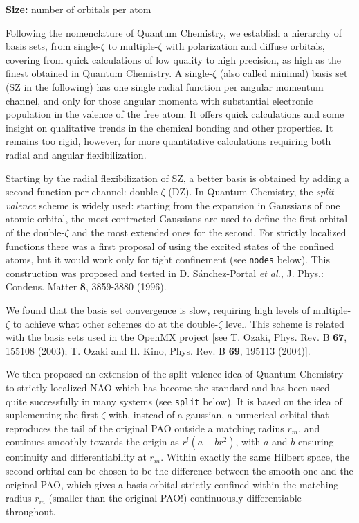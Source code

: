 \textbf{Size:} number of orbitals per atom

  Following the nomenclature of Quantum Chemistry, we establish
a hierarchy of basis sets, from single-$\zeta$ to multiple-$\zeta$
with polarization and diffuse orbitals, covering from quick calculations
of low quality to high precision, as high as the finest obtained in
Quantum Chemistry.
  A single-$\zeta$ (also called minimal) basis set (SZ in the following)
has one single radial function per angular momentum channel, and only for
those angular momenta with substantial electronic population in the valence of
the free atom.
  It offers quick calculations and some insight on qualitative trends
in the chemical bonding and other properties.
  It remains too rigid, however, for more quantitative calculations
requiring both radial and angular flexibilization.

  Starting by the radial flexibilization of SZ, a better basis is obtained
by adding a second function per channel: double-$\zeta$ (DZ).
  In Quantum Chemistry, the \textit{split valence} scheme
is widely used: starting from the expansion in Gaussians of one atomic
orbital, the most contracted Gaussians are used to define the first
orbital of the double-$\zeta$ and the most extended ones for the second.
  For strictly localized functions there was a first proposal
of using the excited states of the confined atoms, but it would work only
for tight confinement (see  \texttt{nodes} below).
  This construction was proposed and tested in D. S\'anchez-Portal
\textit{et al.}, J. Phys.: Condens. Matter \textbf{8}, 3859-3880 (1996).

  We found that the basis set convergence is slow, requiring high levels
of multiple-$\zeta$ to achieve what other schemes do at the double-$\zeta$
level.
  This scheme is related with the basis sets used in the OpenMX project
[see T. Ozaki, Phys. Rev. B \textbf{67}, 155108 (2003); T. Ozaki and H. Kino,
Phys. Rev. B \textbf{69}, 195113 (2004)].

  We then proposed an extension of the split valence idea of Quantum Chemistry
to strictly localized NAO which has become the standard and has been used
quite successfully in many systems (see  \texttt{split} below).
  It is based on the idea of suplementing the first $\zeta$ with, instead of
a gaussian, a numerical orbital that reproduces the tail of the original PAO
outside a matching radius $r_{m}$, and continues smoothly towards the origin as
$r^l(a-br^2)$, with $a$ and $b$ ensuring continuity and differentiability
at $r_{m}$.
  Within exactly the same
Hilbert space, the second orbital can be chosen to be the difference between
the smooth one and the original PAO, which gives a basis orbital strictly
confined within the matching radius $r_{m}$ (smaller than the
original PAO!) continuously differentiable throughout.

